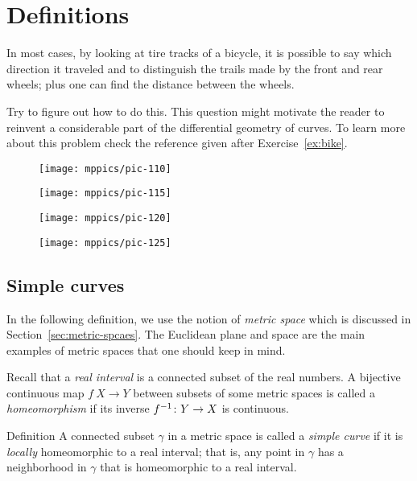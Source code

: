 \chapter{Definitions}
\label{chap:curves-def}

In most cases, by looking at tire tracks of a bicycle,
it is possible to say which direction it traveled and to distinguish the trails made by the front and rear wheels;
plus one can find the distance between the wheels.

Try to figure out how to do this.
This question might motivate the reader to reinvent a considerable part of the differential geometry of curves.
To learn more about this problem check the reference given after Exercise~\ref{ex:bike}.

\vskip-0mm
\begin{figure}[h!]
\begin{minipage}{.48\textwidth}
\centering
\texttt{[image: mppics/pic-110]}
\end{minipage}\hfill
\begin{minipage}{.48\textwidth}
\centering
\texttt{[image: mppics/pic-115]}
\end{minipage}
\bigskip
\begin{minipage}{.48\textwidth}
\centering
\texttt{[image: mppics/pic-120]}
\end{minipage}\hfill
\begin{minipage}{.48\textwidth}
\centering
\texttt{[image: mppics/pic-125]}
\end{minipage}
\end{figure}
\vskip-10mm

\section{Simple curves}

In the following definition, we use the notion of {}\emph{metric space} which is discussed in Section~\ref{sec:metric-spcaes}.
The Euclidean plane and space are the main examples of metric spaces that one should keep in mind.

Recall that a \emph{real interval} is a connected subset of the real numbers.
A bijective continuous map $f\:X\to Y$ between subsets of some metric spaces is called a {}\emph{homeomorphism} if its inverse $f^{-1}\:Y\z\to X$ is continuous.  

\begin{thm}{Definition} 
A connected subset $\gamma$ in a metric space is called a \emph{simple curve} if it is \emph{locally} homeomorphic to a real interval;
that is, any point in $\gamma$ has a neighborhood in $\gamma$ that is homeomorphic to a real interval.
\end{thm}

